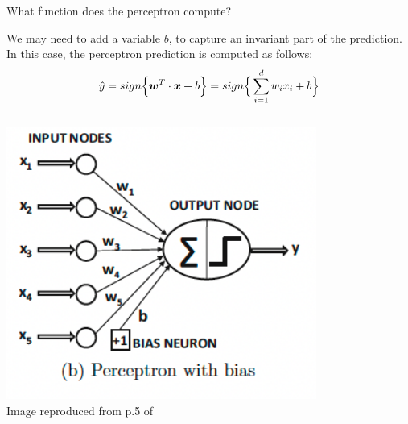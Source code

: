 %
%
%

\begin{frame}[t]{What function does the perceptron compute?}

    We may need to add a  variable $b$, 
    to capture an invariant part of the prediction. 
    In this case, the \gls{perceptron} prediction is computed as follows:
    \begin{equation}
        \hat{y} = 
            sign\Big\{ \boldsymbol{w}^T \cdot \boldsymbol{x} + b \Big\} = 
            sign\Big\{ \sum_{i=1}^{d} w_i x_i + b \Big\}
            \label{eq:perceptron_prediction_w_bias}    
    \end{equation}

    \vspace{-1.0cm}

    \begin{columns}
        \begin{column}{0.50\textwidth}
         \begin{center}
            \includegraphics[width=0.95\textwidth]{./images/perceptron/perceptron_with_bias.png}\\
            {\scriptsize \color{col:attribution} 
            Image reproduced from p.5 of \cite{Aggarwal:2018SpringerDL}}\\
         \end{center}
        \end{column}
        \begin{column}{0.50\textwidth}
            \begin{itemize}

\end{itemize}
\end{column}
\end{columns}
\end{frame}
